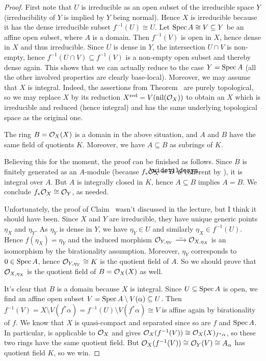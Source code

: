 \documentclass[a4paper,parskip=half,numbers=enddot, DIV=12]{scrreprt}
\begin{document}
\begin{proof}
	First note that $U$ is irreducible as an open subset of the irreducible space $Y$ (irreducibility of $Y$ is implied by $Y$ being normal). Hence $X$ is irreducible because it has the dense irreducible subset $f^{-1}(U)\cong U$. Let $\operatorname{Spec} A\cong V\subseteq Y$ be an affine open subset, where $A$ is a domain. Then $f^{-1}(V)$ is open in $X$, hence dense in $X$ and thus irreducible. Since $U$ is dense in $Y$, the intersection $U\cap V$ is non-empty, hence $f^{-1}(U\cap V)\subseteq f^{-1}(V)$ is a non-empty open subset and thereby dense again. This shows that we can actually reduce to the case $Y=\operatorname{Spec} A$ (all the other involved properties are clearly base-local). Moreover, we may assume that $X$ is integral. Indeed, the assertions from Theorem~ are purely topological, so we may replace $X$ by its reduction $X^{\mathrm{red}}=V(\operatorname{nil}(\mathcal{O}_X))$ to obtain an $X$ which is irreducible and reduced (hence integral) and has the same underlying topological space as the original one.
	\begin{claim}
		The ring $B=\mathcal{O}_X(X)$ is a domain in the above situation, and $A$ and $B$ have the same field of quotients $K$. Moreover, we have $A\subseteq B$ as subrings of $K$.
	\end{claim}
	Believing this for the moment, the proof can be finished as follows. Since $B$ is finitely generated as an $A$-module (because $f_*\Oo_X=\snake{B}$ is coherent by \cite[Theorem~5]{alggeo2}), it is integral over $A$. But $A$ is integrally closed in $K$, hence $A\subseteq B$ implies $A=B$. We conclude $f_*\mathcal{O}_X\cong \mathcal{O}_Y$, as needed.
	
	Unfortunately, the proof of Claim~ wasn't discussed in the lecture, but I think it should have been. Since $X$ and $Y$ are irreducible, they have unique generic points $\eta_X$ and $\eta_Y$. As $\eta_Y$ is dense in $Y$, we have $\eta_Y\in U$ and similarly $\eta_X\in f^{-1}(U)$. Hence $f(\eta_X)=\eta_Y$ and the induced morphism $\Oo_{Y,\eta_Y}\isomorphism\Oo_{X,\eta_X}$ is an isomorphism by the birationality assumption. Moreover, $\eta_Y$ corresponds to $0\in\operatorname{Spec} A$, hence $\mathcal{O}_{Y,\eta_Y}\cong K$ is the quotient field of $A$. So we should prove that $\mathcal{O}_{X,\eta_X}$ is the quotient field of $B=\mathcal{O}_X(X)$ as well.
	
	It's clear that $B$ is a domain because $X$ is integral. Since $U\subseteq \operatorname{Spec} A$ is open, we find an affine open subset $V=\operatorname{Spec} A\setminus V(\alpha)\subseteq U$. Then $f^{-1}(V)=X\setminus V(f^*\alpha)=f^{-1}(U)\setminus V(f^*\alpha)\cong V$ is affine again by birationality of $f$. We know that $X$ is quasi-compact and separated since so are $f$ and $\operatorname{Spec} A$. In particular, \cite[Proposition~1.5.1]{alggeo1} is applicable to $\mathcal{O}_X$ and gives $\mathcal{O}_X(f^{-1}(V))\cong\mathcal{O}_X(X)_{f^*\alpha}$, so these two rings have the same quotient field. But $\mathcal{O}_X(f^{-1}(V))\cong \mathcal{O}_Y(V)\cong A_\alpha$ has quotient field $K$, so we win.
	

\end{proof}
\end{document}
